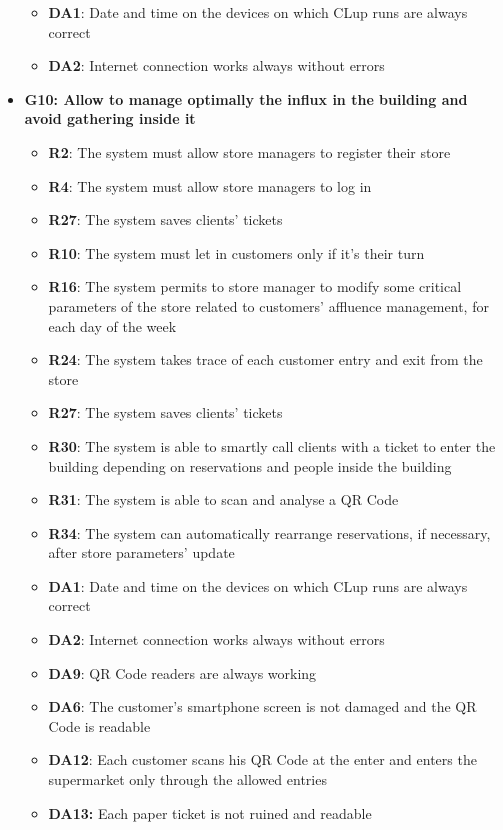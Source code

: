 \documentclass{article}
\begin{document}
\begin{itemize}
\begin{itemize}
						\item {\bfseries DA1}: Date and time on the devices on which CLup runs are always correct
						\item {\bfseries DA2}: Internet connection works always without errors
					
					\end{itemize}
				
				\item {\bfseries G10: Allow to manage optimally the influx in the building and avoid gathering inside it}	

					\begin{itemize}
						\item {\bfseries R2}: The system must allow store managers to register their store
						\item {\bfseries R4}: The system must allow store managers to log in
						\item {\bfseries R27}: The system saves clients' tickets			
											
						\item {\bfseries R10}: The system must let in customers only if it's their turn
						\item {\bfseries R16}: The system permits to store manager to modify some critical parameters of the store related to customers' affluence management, for each day of the week
						\item {\bfseries R24}: The system takes trace of each customer entry and exit from the store
						\item {\bfseries R27}: The system saves clients' tickets				
						\item {\bfseries R30}: The system is able to smartly call clients with a ticket to enter the building depending on reservations and people inside the building
						\item {\bfseries R31}: The system is able to scan and analyse a QR Code 
						\item{\bfseries R34}: The system can automatically rearrange reservations, if necessary, after store parameters' update\\
		
						\item {\bfseries DA1}: Date and time on the devices on which CLup runs are always correct
						\item {\bfseries DA2}: Internet connection works always without errors
						\item {\bfseries DA9}: QR Code readers are always working
						\item{\bfseries DA6}: The customer’s smartphone screen is not damaged and the QR Code is readable
						\item {\bfseries DA12}: Each customer scans his QR Code at the enter and enters the supermarket only through the allowed entries
						\item {\bfseries DA13:} Each paper ticket is not ruined and readable
					

\end{itemize}
\end{itemize}
\end{document}
